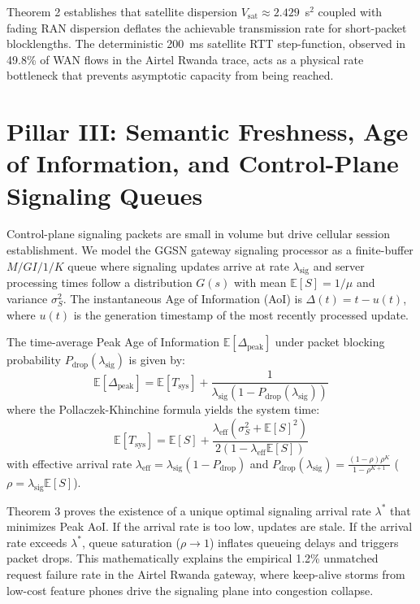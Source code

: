 \documentclass[journal]{IEEEtran}
\begin{document}
Theorem 2 establishes that satellite dispersion $V_{\text{sat}} \approx 2.429$~s$^2$ coupled with fading RAN dispersion deflates the achievable transmission rate for short-packet blocklengths. The deterministic 200~ms satellite RTT step-function, observed in 49.8\% of WAN flows in the Airtel Rwanda trace, acts as a physical rate bottleneck that prevents asymptotic capacity from being reached.

\section{Pillar III: Semantic Freshness, Age of Information, and Control-Plane Signaling Queues}
Control-plane signaling packets are small in volume but drive cellular session establishment. We model the GGSN gateway signaling processor as a finite-buffer $M/GI/1/K$ queue where signaling updates arrive at rate $\lambda_{\text{sig}}$ and server processing times follow a distribution $G(s)$ with mean $\mathbb{E}[S] = 1/\mu$ and variance $\sigma_S^2$. The instantaneous Age of Information (AoI) is $\Delta(t) = t - u(t)$, where $u(t)$ is the generation timestamp of the most recently processed update.

\begin{theorem}
The time-average Peak Age of Information $\mathbb{E}[\Delta_{\text{peak}}]$ under packet blocking probability $P_{\text{drop}}(\lambda_{\text{sig}})$ is given by:
\begin{equation}
\mathbb{E}[\Delta_{\text{peak}}] = \mathbb{E}[T_{\text{sys}}] + \frac{1}{\lambda_{\text{sig}}(1 - P_{\text{drop}}(\lambda_{\text{sig}}))}
\end{equation}
where the Pollaczek-Khinchine formula yields the system time:
\begin{equation}
\mathbb{E}[T_{\text{sys}}] = \mathbb{E}[S] + \frac{\lambda_{\text{eff}}(\sigma_S^2 + \mathbb{E}[S]^2)}{2(1 - \lambda_{\text{eff}}\mathbb{E}[S])}
\end{equation}
with effective arrival rate $\lambda_{\text{eff}} = \lambda_{\text{sig}}(1 - P_{\text{drop}})$ and $P_{\text{drop}}(\lambda_{\text{sig}}) = \frac{(1-\rho)\rho^K}{1-\rho^{K+1}}$ ($\rho = \lambda_{\text{sig}}\mathbb{E}[S]$).
\end{theorem}

Theorem 3 proves the existence of a unique optimal signaling arrival rate $\lambda^*$ that minimizes Peak AoI. If the arrival rate is too low, updates are stale. If the arrival rate exceeds $\lambda^*$, queue saturation ($\rho \to 1$) inflates queueing delays and triggers packet drops. This mathematically explains the empirical 1.2\% unmatched request failure rate in the Airtel Rwanda gateway, where keep-alive storms from low-cost feature phones drive the signaling plane into congestion collapse.
\end{document}
